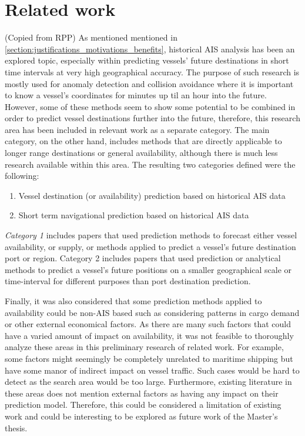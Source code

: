 \chapter{Related work}

(Copied from RPP)
As mentioned mentioned in \cref{section:justifications_motivations_benefits}, historical AIS analysis has been an explored topic, especially within predicting vessels’ future destinations in short time intervals at very high geographical accuracy. The purpose of such research is mostly used for anomaly detection and collision avoidance where it is important to know a vessel’s coordinates for minutes up til an hour into the future. However, some of these methods seem to show some potential to be combined in order to predict vessel destinations further into the future, therefore, this research area has been included in relevant work as a separate category. The main category, on the other hand, includes methods that are directly applicable to longer range destinations or general availability, although there is much less research available within this area. The resulting two categories defined were the following:

\begin{enumerate}
    \item Vessel destination (or availability) prediction based on historical AIS data
    \item Short term navigational prediction based on historical AIS data
\end{enumerate}

\textit{Category 1} includes papers that used prediction methods to forecast either vessel availability, or supply, or methods applied to predict a vessel’s future destination port or region. Category 2 includes papers that used prediction or analytical methods to predict a vessel’s future positions on a smaller geographical scale or time-interval for different purposes than port destination prediction.

Finally, it was also considered that some prediction methods applied to availability could be non-AIS based such as considering patterns in cargo demand or other external economical factors. As there are many such factors that could have a varied amount of impact on availability, it was not feasible to thoroughly analyze these areas in this preliminary research of related work. For example, some factors might seemingly be completely unrelated to maritime shipping but have some manor of indirect impact on vessel traffic. Such cases would be hard to detect as the search area would be too large. Furthermore, existing literature in these areas does not mention external factors as having any impact on their prediction model. Therefore, this could be considered a limitation of existing work and could be interesting to be explored as future work of the Master’s thesis.

